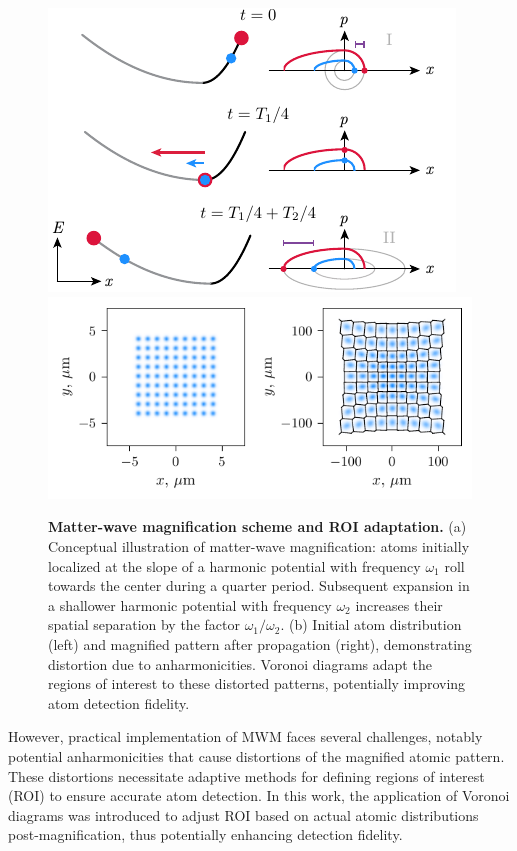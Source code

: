 \begin{figure}
    \centering
    \includegraphics{fig-ai/mwm-scheme.pdf}
    \includegraphics{fig-py/mwm.pdf}
    \caption[Matter-wave magnification scheme and ROI adaptation]{
    \textbf{Matter-wave magnification scheme and ROI adaptation.}
    (a) Conceptual illustration of matter-wave magnification: atoms initially localized at the slope of a harmonic potential with frequency $\omega_1$ roll towards the center during a quarter period. Subsequent expansion in a shallower harmonic potential with frequency $\omega_2$ increases their spatial separation by the factor $\omega_1/\omega_2$.
    (b) Initial atom distribution (left) and magnified pattern after propagation (right), demonstrating distortion due to anharmonicities. Voronoi diagrams adapt the regions of interest to these distorted patterns, potentially improving atom detection fidelity.
    }
    \label{fig:mwm}
\end{figure}

However, practical implementation of MWM faces several challenges, notably potential anharmonicities that cause distortions of the magnified atomic pattern. These distortions necessitate adaptive methods for defining regions of interest (ROI) to ensure accurate atom detection. In this work, the application of Voronoi diagrams was introduced to adjust ROI based on actual atomic distributions post-magnification, thus potentially enhancing detection fidelity.

